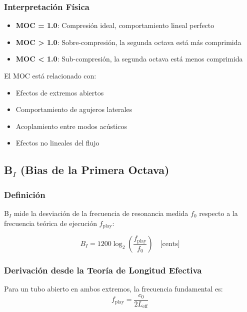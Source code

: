 \documentclass[12pt,a4paper,twocolumn]{article}
\newcommand{\freqzero}{f_0}
\newcommand{\freqplay}{f_{\text{play}}}
\begin{document}
\subsubsection{Interpretación Física}

\begin{itemize}
    \item \textbf{MOC = 1.0}: Compresión ideal, comportamiento lineal perfecto
    \item \textbf{MOC > 1.0}: Sobre-compresión, la segunda octava está más comprimida
    \item \textbf{MOC < 1.0}: Sub-compresión, la segunda octava está menos comprimida
\end{itemize}

El MOC está relacionado con:
\begin{itemize}
    \item Efectos de extremos abiertos
    \item Comportamiento de agujeros laterales
    \item Acoplamiento entre modos acústicos
    \item Efectos no lineales del flujo
\end{itemize}

\subsection{B$_I$ (Bias de la Primera Octava)}

\subsubsection{Definición}

B$_I$ mide la desviación de la frecuencia de resonancia medida $\freqzero$ respecto a la frecuencia teórica de ejecución $\freqplay$:

\begin{equation}
B_I = 1200 \log_2\left(\frac{\freqplay}{\freqzero}\right) \quad \text{[cents]}
\label{eq:bi_def}
\end{equation}

\subsubsection{Derivación desde la Teoría de Longitud Efectiva}

Para un tubo abierto en ambos extremos, la frecuencia fundamental es:
\begin{equation}
\freqplay = \frac{c_0}{2 L_{\text{eff}}}
\label{eq:freq_fundamental}
\end{equation}
\end{document}
